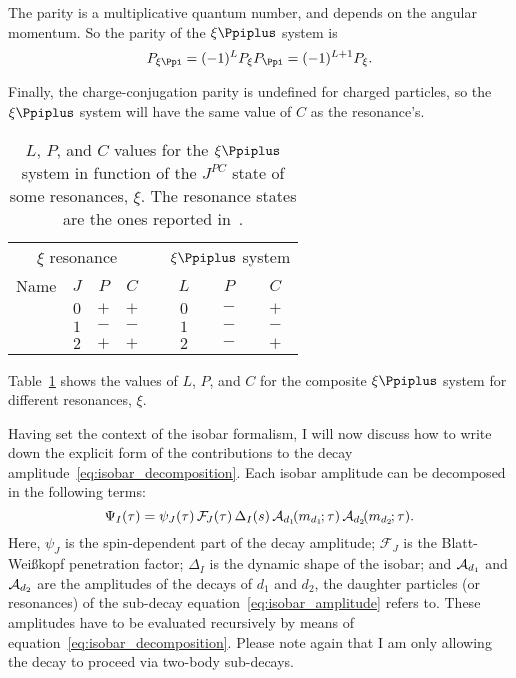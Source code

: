     The parity is a multiplicative quantum number, and depends on the angular momentum.
    So the parity of the $\xi\Ppiplus$ system is
    \begin{equation}
        P_{\xi\Ppi} = (-1)^L P_{\xi} P_{\Ppi} = (-1)^{L+1} P_{\xi}.
    \end{equation}


    Finally, the charge-conjugation parity is undefined for charged particles, so the $\xi\Ppiplus$ system will have the same value of $C$ as the resonance's. 
    \begin{table}
        \centering
        \caption{$L$, $P$, and $C$ values for the $\xi\Ppiplus$ system in function of the $J^{PC}$ state of some resonances, $\xi$.
                 The resonance states are the ones reported in~\cite{chinese_phisics}.}
        \label{table:composite_resonance_system}
        \begin{tabular}{lccccccc}
            \toprule
            \multicolumn{4}{c}{$\xi$ resonance}   & &\multicolumn{3}{c}{$\xi\Ppiplus$ system} \\ \cline{1-4} \cline{6-8}
            Name   &$J$ &$P$ &$C$                 & &$L$ &$P$ &$C$\\
            \midrule
            \Pfnez{}    &$0$ &$+$ &$+$            & &$0$ &$-$ &$+$\\
            \Prhozero{} &$1$ &$-$ &$-$            & &$1$ &$-$ &$-$\\
            \Pfii{}     &$2$ &$+$ &$+$            & &$2$ &$-$ &$+$\\
            \bottomrule
        \end{tabular}
    \end{table}
    Table~\ref{table:composite_resonance_system} shows the values of $L$, $P$, and $C$ for the composite $\xi\Ppiplus$ system for different resonances, $\xi$.


    Having set the context of the isobar formalism, I will now discuss how to write down the explicit form of the contributions to the decay amplitude~\eqref{eq:isobar_decomposition}.
    Each isobar amplitude can be decomposed in the following terms:
    \begin{equation}\label{eq:isobar_amplitude}
        \Psi_I(\tau) = \psi_J(\tau)\,\mathcal{F\!}_{J}(\tau)\,\Delta_I(s)\,\mathcal{A}_{d_1}\!(m_{d_1\!}; \tau)\,\mathcal{A}_{d_2}\!(m_{d_2\!}; \tau).
    \end{equation}
    Here, $\psi_J$ is the spin-dependent part of the decay amplitude;
    $\mathcal{F\!}_J$ is the Blatt-Wei\ss{}kopf penetration factor;
    $\Delta_I$ is the dynamic shape of the isobar;
    and $\mathcal{A}_{d_1}$ and $\mathcal{A}_{d_2}$ are the amplitudes of the decays of $d_1$ and $d_2$, the daughter particles (or resonances) of the sub-decay equation~\eqref{eq:isobar_amplitude} refers to.
    These amplitudes have to be evaluated recursively by means of equation~\eqref{eq:isobar_decomposition}.
    Please note again that I am only allowing the decay to proceed via two-body sub-decays.



